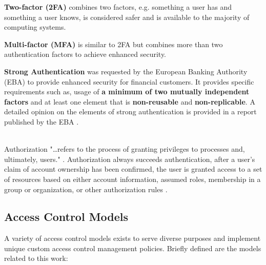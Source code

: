 \begin{description}
\begin{description}
		\item \textbf{Two-factor (2FA)} combines two factors, e.g. something a user has and something a user knows, is considered safer and is available to the majority of computing systems. 
		\item \textbf{Multi-factor (MFA)} is similar to 2FA but combines more than two authentication factors to achieve enhanced security.
		\item \textbf{Strong Authentication} was requested by the European Banking Authority (EBA) \cite{strong-authentication} to provide enhanced security for financial customers. It provides specific requirements such as, usage of \textbf{a minimum of two mutually independent factors} and at least one element that is \textbf{non-reusable} and \textbf{non-replicable}. A detailed opinion on the elements of strong authentication is provided in a report published by the EBA \cite{strong-authentication-opinion}.
	\end{description}
	\item[Authorization] \hfill \\
	Authorization "\dots refers to the process of granting privileges to processes and, ultimately, users." \cite{authentication-def-ietf}. Authorization always succeeds authentication, after a user's claim of account ownership has been confirmed, the user is granted access to a set of resources based on either account information, assumed roles, membership in a group or organization, or other authorization rules \cite{auth-rules-ibm}. 
\end{description}

\subsection{Access Control Models} \label{ssec:access-control-models}

A variety of access control models exists to serve diverse purposes and implement unique custom access control management policies. Briefly defined are the models related to this work:

